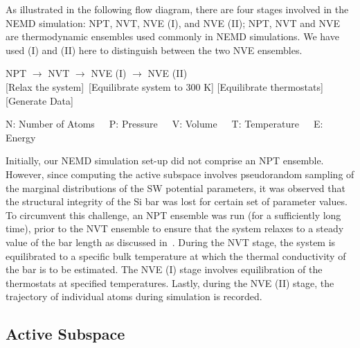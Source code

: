 As illustrated in the following flow diagram, there are four stages involved in the NEMD simulation: 
NPT, NVT, NVE (I), and
NVE (II); NPT, NVT and NVE are thermodynamic ensembles used commonly in NEMD simulations. We have used
(I) and (II) here to distinguish between the two NVE ensembles. 
%
\begin{center}

NPT \hspace{5mm} $\rightarrow$ \hspace{5mm} NVT \hspace{5mm} $\rightarrow$ \hspace{5mm} NVE (I) \hspace{5mm}
$\rightarrow$ \hspace{5mm} NVE (II)
\\ \vspace{1mm}
\tiny [Relax the system]~[Equilibrate system to 300 K] \hspace{1mm} [Equilibrate thermostats] \hspace{4mm}
 [Generate Data]
\\ \vspace{1mm}

\tiny{N: Number of Atoms~~~P: Pressure~~~V: Volume~~~T: Temperature~~~E: Energy}
\end{center}
%
Initially, our NEMD simulation set-up did not comprise an NPT ensemble. However,
since computing the active subspace involves pseudorandom sampling of the marginal distributions
of the SW potential parameters, it was observed that the structural integrity of the Si bar was lost for
certain set of parameter values. To circumvent this challenge, an NPT ensemble was run
(for a sufficiently long time), prior to the NVT ensemble to ensure that the system relaxes to a 
steady value of the bar length as discussed in~\cite{Vohra:2018a}.
During the NVT stage, the system is equilibrated to a specific bulk temperature at which the thermal
conductivity of the bar is to be estimated. The NVE (I) stage involves equilibration of the thermostats
at specified temperatures. Lastly, during the NVE (II) stage, the trajectory of individual atoms during
simulation is recorded.

\subsection{Active Subspace}
\label{sub:as}

